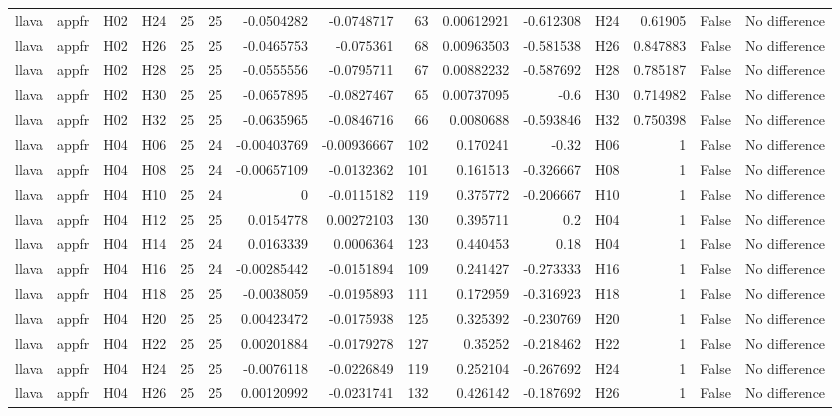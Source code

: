 \begin{longtable}{llllrrrrrrrlrrl}
llava & appfr & H02 & H24 & 25 & 25 & -0.0504282 & -0.0748717 & 63 & 0.00612921 & -0.612308 & H24 & 0.61905 & False & No difference \\
llava & appfr & H02 & H26 & 25 & 25 & -0.0465753 & -0.075361 & 68 & 0.00963503 & -0.581538 & H26 & 0.847883 & False & No difference \\
llava & appfr & H02 & H28 & 25 & 25 & -0.0555556 & -0.0795711 & 67 & 0.00882232 & -0.587692 & H28 & 0.785187 & False & No difference \\
llava & appfr & H02 & H30 & 25 & 25 & -0.0657895 & -0.0827467 & 65 & 0.00737095 & -0.6 & H30 & 0.714982 & False & No difference \\
llava & appfr & H02 & H32 & 25 & 25 & -0.0635965 & -0.0846716 & 66 & 0.0080688 & -0.593846 & H32 & 0.750398 & False & No difference \\
llava & appfr & H04 & H06 & 25 & 24 & -0.00403769 & -0.00936667 & 102 & 0.170241 & -0.32 & H06 & 1 & False & No difference \\
llava & appfr & H04 & H08 & 25 & 24 & -0.00657109 & -0.0132362 & 101 & 0.161513 & -0.326667 & H08 & 1 & False & No difference \\
llava & appfr & H04 & H10 & 25 & 24 & 0 & -0.0115182 & 119 & 0.375772 & -0.206667 & H10 & 1 & False & No difference \\
llava & appfr & H04 & H12 & 25 & 25 & 0.0154778 & 0.00272103 & 130 & 0.395711 & 0.2 & H04 & 1 & False & No difference \\
llava & appfr & H04 & H14 & 25 & 24 & 0.0163339 & 0.0006364 & 123 & 0.440453 & 0.18 & H04 & 1 & False & No difference \\
llava & appfr & H04 & H16 & 25 & 24 & -0.00285442 & -0.0151894 & 109 & 0.241427 & -0.273333 & H16 & 1 & False & No difference \\
llava & appfr & H04 & H18 & 25 & 25 & -0.0038059 & -0.0195893 & 111 & 0.172959 & -0.316923 & H18 & 1 & False & No difference \\
llava & appfr & H04 & H20 & 25 & 25 & 0.00423472 & -0.0175938 & 125 & 0.325392 & -0.230769 & H20 & 1 & False & No difference \\
llava & appfr & H04 & H22 & 25 & 25 & 0.00201884 & -0.0179278 & 127 & 0.35252 & -0.218462 & H22 & 1 & False & No difference \\
llava & appfr & H04 & H24 & 25 & 25 & -0.0076118 & -0.0226849 & 119 & 0.252104 & -0.267692 & H24 & 1 & False & No difference \\
llava & appfr & H04 & H26 & 25 & 25 & 0.00120992 & -0.0231741 & 132 & 0.426142 & -0.187692 & H26 & 1 & False & No difference \\

\end{longtable}
